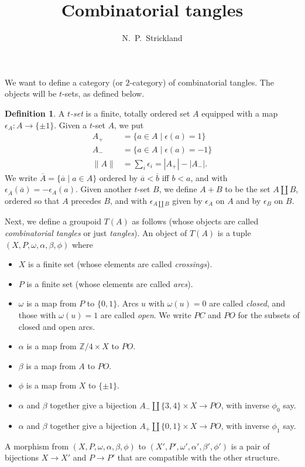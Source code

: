 \documentclass{amsart}
\newcommand{\Z}         {{\mathbb{Z}}}
\newcommand{\al}        {\alpha}
\newcommand{\bt}        {\beta}
\newcommand{\ep}        {\epsilon}
\newcommand{\om}        {\omega}
\newcommand{\ov}[1]     {\overline{#1}}
\newcommand{\st}        {\;|\;}
\newcommand{\tm}        {\times}
\renewcommand{\:}{\colon}
\theoremstyle{definition}
\newtheorem{definition}[theorem]{Definition}
\begin{document}
\title{Combinatorial tangles}
\author{N.~P.~Strickland}

\maketitle 

We want to define a category (or $2$-category) of combinatorial
tangles.  The objects will be $t$-sets, as defined below.

\begin{definition}
 A \emph{$t$-set} is a finite, totally ordered set $A$ equipped with a
 map $\ep_A\:A\to\{\pm 1\}$.  Given a $t$-set $A$, we put 
 \begin{align*}
  A_+ &= \{a\in A\st \ep(a)=1\} \\
  A_- &= \{a\in A\st \ep(a)=-1\} \\
  \|A\| &= \sum_i\ep_i = |A_+| - |A_-|. 
 \end{align*}
 We write $\ov{A}=\{\ov{a}\st a\in A\}$ ordered by $\ov{a}<\ov{b}$ iff
 $b<a$, and with $\ep_{\ov{A}}(\ov{a})=-\ep_A(a)$.  Given another
 $t$-set $B$, we define $A+B$ to be the set $A\amalg B$, ordered so
 that $A$ precedes $B$, and with $\ep_{A\amalg B}$ given by $\ep_A$ on
 $A$ and by $\ep_B$ on $B$.
\end{definition}

Next, we define a groupoid $T(A)$ as follows (whose objects are called
\emph{combinatorial tangles} or just \emph{tangles}).  An object of
$T(A)$ is a tuple $(X,P,\om,\al,\bt,\phi)$ where
\begin{itemize}
 \item $X$ is a finite set (whose elements are called
  \emph{crossings}).
 \item $P$ is a finite set (whose elements are called \emph{arcs}).  
 \item $\om$ is a map from $P$ to $\{0,1\}$.  Arcs $u$ with $\om(u)=0$
  are called \emph{closed}, and those with $\om(u)=1$ are called
  \emph{open}.  We write $PC$ and $PO$ for the subsets of closed and
  open arcs.
 \item $\al$ is a map from $\Z/4\tm X$ to $PO$.
 \item $\bt$ is a map from $A$ to $PO$.
 \item $\phi$ is a map from $X$ to $\{\pm 1\}$.
 \item $\al$ and $\bt$ together give a bijection
  $A_-\amalg\{3,4\}\tm X\to PO$, with inverse $\phi_0$ say.
 \item $\al$ and $\bt$ together give a bijection
  $A_+\amalg\{0,1\}\tm X\to PO$, with inverse $\phi_1$ say.
\end{itemize}
A morphism from $(X,P,\om,\al,\bt,\phi)$ to
$(X',P',\om',\al',\bt',\phi')$ is a pair of bijections $X\to X'$ and
$P\to P'$ that are compatible with the other structure. 
\end{document}

